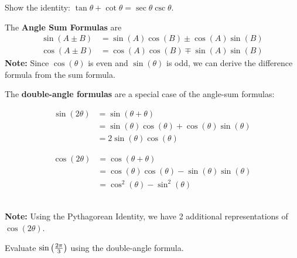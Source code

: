 \documentclass[../mathNotesPreamble]{subfiles}
\begin{document}
    \begin{ex*}
      Show the identity: $\tan\theta+\cot\theta=\sec\theta\csc\theta$.
    \end{ex*}
    \pagebreak

    \begin{defn*}
      The \textbf{Angle Sum Formulas} are
      \begin{align*}
        \sin(A\pm B)&=\sin(A)\cos(B)\pm\cos(A)\sin(B)\\
        \cos(A\pm B)&=\cos(A)\cos(B)\mp\sin(A)\sin(B)
      \end{align*}
      \textbf{Note:} Since $\cos(\theta)$ is even and $\sin(\theta)$ is odd, we can derive the difference formula from the sum formula.
    \end{defn*}
    \vspace*{15pt}

    \begin{defn*}
      The \textbf{double-angle formulas} are a special case of the angle-sum formulas:
      \begin{minipage}{0.5\linewidth}
        \begin{align*}
          \sin(2\theta)&=\sin(\theta+\theta)\\
            &=\sin(\theta)\cos(\theta)+\cos(\theta)\sin(\theta)\\
            &=\boxed{2\sin(\theta)\cos(\theta)}
        \end{align*}
      \end{minipage}%
      \begin{minipage}{0.5\linewidth}
        \begin{align*}
          \cos(2\theta)&=\cos(\theta+\theta)\\
            &=\cos(\theta)\cos(\theta)-\sin(\theta)\sin(\theta)\\
            &=\boxed{\cos^2(\theta)-\sin^2(\theta)}
        \end{align*}
      \end{minipage}\\[15pt]

    \textbf{Note:} Using the Pythagorean Identity, we have 2 additional representations of $\cos(2\theta)$.
    \end{defn*}

    \begin{ex*}
      Evaluate $\sin{\left(\frac{2\pi}{3}\right)}$ using the double-angle formula.
    \end{ex*}
    \pagebreak
\end{document}
